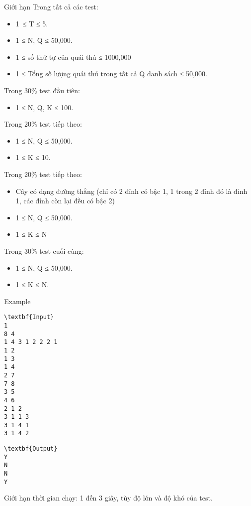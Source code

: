 Giới hạn
Trong tất cả các test:
\begin{itemize}
	\item 1 ≤ T ≤ 5.
	\item 1 ≤ N, Q ≤ 50,000.
	\item 1 ≤ số thứ tự của quái thú ≤ 1000,000
	\item 1 ≤ Tổng số lượng quái thú trong tất cả Q danh sách ≤ 50,000.
\end{itemize}

Trong 30\% test đầu tiên:
\begin{itemize}
	\item 1 ≤ N, Q, K ≤ 100.
\end{itemize}

Trong 20\% test tiếp theo:
\begin{itemize}
	\item 1 ≤ N, Q ≤ 50,000.
	\item 1 ≤ K ≤ 10.
\end{itemize}

Trong 20\% test tiếp theo:
\begin{itemize}
	\item Cây có dạng đường thẳng (chỉ có 2 đỉnh có bậc 1, 1 trong 2 đỉnh đó là đỉnh 1, các đỉnh còn lại đều có bậc 2)
	\item 1 ≤ N, Q ≤ 50,000.
	\item 1 ≤ K ≤ N
\end{itemize}

Trong 30\% test cuối cùng:
\begin{itemize}
	\item 1 ≤ N, Q ≤ 50,000.
	\item 1 ≤ K ≤ N.
\end{itemize}
Example
\begin{verbatim}
\textbf{Input}
1
8 4
1 4 3 1 2 2 2 1
1 2
1 3
1 4
2 7
7 8
3 5
4 6
2 1 2
3 1 1 3
3 1 4 1
3 1 4 2
\end{verbatim}
\begin{verbatim}
\textbf{Output}
Y
N
N
Y
\end{verbatim}
Giới hạn thời gian chạy:
1 đến 3 giây, tùy độ lớn và độ khó của test.